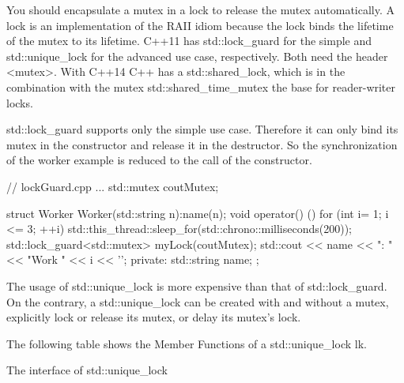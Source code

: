 
You should encapsulate a mutex in a lock to release the mutex automatically. A lock is an implementation of the RAII idiom because the lock binds the lifetime of the mutex to its lifetime. C++11 has std::lock\_guard for the simple and std::unique\_lock for the advanced use case, respectively. Both need the header <mutex>. With C++14 C++ has a std::shared\_lock, which is in the combination with the mutex std::shared\_time\_mutex the base for reader-writer locks.


std::lock\_guard supports only the simple use case. Therefore it can only bind its mutex in the constructor and release it in the destructor. So the synchronization of the worker example is reduced to the call of the constructor.


\begin{cpp}
// lockGuard.cpp
...
std::mutex coutMutex;

struct Worker{
	Worker(std::string n):name(n){};
	void operator() (){
		for (int i= 1; i <= 3; ++i){
			std::this_thread::sleep_for(std::chrono::milliseconds(200));
			std::lock_guard<std::mutex> myLock(coutMutex);
			std::cout << name << ": " << "Work " << i << '\n';
		}
	}
	private:
	std::string name;
};
\end{cpp}


The usage of std::unique\_lock is more expensive than that of std::lock\_guard. On the contrary, a std::unique\_lock can be created with and without a mutex, explicitly lock or release its mutex, or delay its mutex’s lock.

The following table shows the Member Functions of a std::unique\_lock lk.

\begin{center}
The interface of std::unique\_lock
\end{center}

